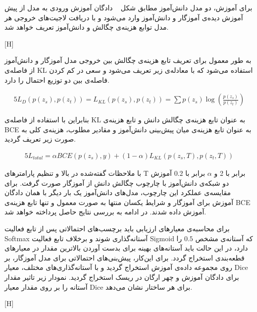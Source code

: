 برای آموزش، دو مدل دانش‌آموز مطابق شکل ~ دادگان آموزش ورودی به مدل از پیش آموزش دیده‌ی آموزگار و دانش‌آموز وارد می‌شود و با دریافت لاجیت‌های خروجی هر مدل توابع هزینه‌ی چگالش و دانش‌آموز تعریف خواهد شد.

[H]

به طور معمول برای تعریف تابع هزینه‌ی چگالش بین خروجی مدل آموزگار و دانش‌آموز از فاصله‌ی KL استفاده می‌شود  که با معادله‌ی زیر تعریف می‌شود و سعی در کم کردن فاصله‌ی بین دو توزیع احتمال را دارد. 

\begin{alignat}{5}
	L_D(p(z_s), p(z_t)) = L_{KL}(p(z_s), p(z_t)) = \sum p(z_s) \log(\frac{p(z_s)}{p(z_t)})    \label{kldivergence} 
\end{alignat}

بنابراین با استفاده از فاصله‌ی KL به عنوان تابع هزینه‌ی چگالش دانش و تابع هزینه‌ی BCE به عنوان تابع هزینه‌ی میان پیش‌بینی دانش‌آموز و مقادیر مطلوب، هزینه‌ی کلی به صورت زیر تعریف گردید.
 
\begin{alignat}{5}
	L_{total} = \alpha BCE(p(z_s), y) + (1-\alpha)L_{KL}(p(z_s,T), p(z_t,T))     \label{bceklloss} 
\end{alignat}

با ملاحظات گفته‌شده در بالا و تنظیم پارامترهای T برابر با 2 و $\alpha$ برابر با $0.2$ آموزش دو شبکه‌ی دانش‌آموز با چارچوب چگالش دانش از آموزگار صورت گرفت. برای مقایسه‌ی عملکرد این چارچوب، مدل‌های دانش‌آموز یک‌ بار دیگر با همان دادگان آموزش برای آموزگار و شرایط یکسان منتها به صورت معمول و تنها تابع هزینه‌ی BCE آموزش داده شدند. در ادامه به بررسی نتایج حاصل پرداخته خواهد شد.


برای محاسبه‌ی معیارهای ارزیابی باید برچسب‌های احتمالاتی پس از تابع فعالیت Softmax آستانه‌گذاری شوند و برخلاف تابع فعالیت Sigmoid که آستانه‌ی مشخص $0.5$ را دارد، در این حالت باید آستانه‌های بهینه برای بدست آوردن بالاترین مقدار در معیارهای قطعه‌بندی استخراج گردد. برای این‌کار، پیش‌بنی‌های احتمالاتی برای مدل آموزگار، بر روی مجموعه‌ داده‌ی آموزش استخراج گردید و با آستانه‌گذاری‌های مختلف، معیار Dice برای دادگان آموزش و چهر ارگان در ریسک استخراج گردید. نمودار زیر تاثیر مقدار آستانه را بر روی مقدار معیار Dice برای هر ساختار نشان می‌دهد.

[H]

